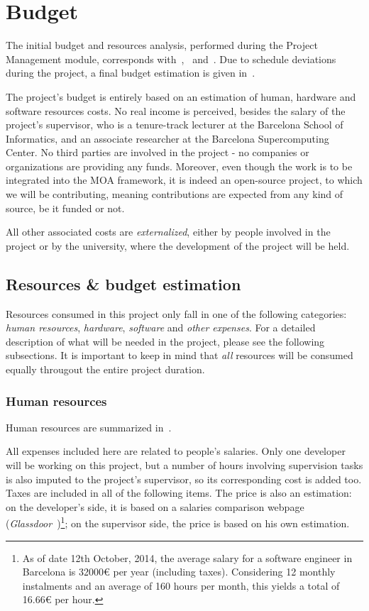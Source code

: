 \section{Budget}
\label{Management:Budget}

The initial budget and resources analysis, performed during the Project Management module, corresponds with~,~ and~. Due to schedule deviations during the project, a final budget estimation is given in~.

The project’s budget is entirely based on an estimation of human, hardware and software resources costs. No real income is perceived, besides the salary of the project’s supervisor, who is a tenure-track lecturer at the Barcelona School of Informatics, and an associate researcher at the Barcelona Supercomputing Center. No third parties are involved in the project - no companies or organizations are providing any funds. Moreover, even though the work is to be integrated into the MOA framework, it is indeed an open-source project, to which we will be contributing, meaning contributions are expected from any kind of source, be it funded or not.

All other associated costs are \textit{externalized}, either by people involved in the project or by the university, where the development of the project will be held.

\subsection{Resources \& budget estimation}
\label{Management:Budget:Resources}

Resources consumed in this project only fall in one of the following categories: \textit{human resources}, \textit{hardware}, \textit{software} and \textit{other expenses}. For a detailed description of what will be needed in the project, please see the following subsections. It is important to keep in mind that \textit{all} resources will be consumed equally througout the entire project duration.

\subsubsection{Human resources}

Human resources are summarized in~.

All expenses included here are related to people’s salaries. Only one developer will be working on this project, but a number of hours involving supervision tasks is also imputed to the project’s supervisor, so its corresponding cost is added too. Taxes are included in all of the following items. The price is also an estimation: on the developer’s side, it is based on a salaries comparison webpage (\textit{Glassdoor}~\citep{web:Glassdoor})\footnote{As of date 12th October, 2014, the average salary for a software engineer in Barcelona is 32000€ per year (including taxes). Considering 12 monthly instalments and an average of 160 hours per month, this yields a total of 16.66€ per hour.}; on the supervisor side, the price is based on his own estimation.

